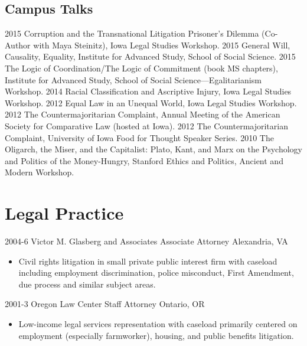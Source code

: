 \documentclass[letterpaper]{moderncv}
\begin{document}
\subsection{Campus Talks}
\cvitem
{2015}
{Corruption and the Transnational Litigation Prisoner's Dilemma (Co-Author with Maya Steinitz), Iowa Legal Studies Workshop.}
\vspace{1mm}
\cvitem
{2015}
{General Will, Causality, Equality, Institute for Advanced Study, School of Social Science.}
\vspace{1mm}
\cvitem
{2015}
{The Logic of Coordination/The Logic of Commitment (book MS chapters), Institute for Advanced Study, School of Social Science---Egalitarianism Workshop.}
\vspace{1mm}
\cvitem
{2014}
{Racial Classification and Ascriptive Injury, Iowa Legal Studies Workshop.}
\vspace{1mm}
\cvitem
{2012}
{Equal Law in an Unequal World, Iowa Legal Studies Workshop.}
\vspace{1mm}
\cvitem
{2012}
{The Countermajoritarian Complaint, Annual Meeting of the American Society for Comparative Law (hosted at Iowa).}
\vspace{1mm}
\cvitem
{2012}
{The Countermajoritarian Complaint, University of Iowa Food for Thought Speaker Series.}
\vspace{1mm}
\cvitem
{2010}
{The Oligarch, the Miser, and the Capitalist: Plato, Kant, and Marx on the Psychology and Politics of the Money-Hungry, Stanford Ethics and Politics, Ancient and Modern Workshop.}
\vspace{1mm}

\section{Legal Practice}

\cventry
{2004-6}
{Victor M. Glasberg and Associates}
{Associate Attorney}
{Alexandria, VA}
{}
{\begin{itemize}%
	\item Civil rights litigation in small private public interest firm with caseload including employment discrimination,
    police misconduct, First Amendment, due process and similar subject areas.
	\end{itemize}}

\cventry
{2001-3}
{Oregon Law Center}
{Staff Attorney}
{Ontario, OR}
{}
{\begin{itemize}%
	\item Low-income legal services representation with caseload primarily centered on employment
    (especially farmworker), housing, and public benefits litigation.
	\end{itemize}}
\end{document}
